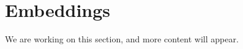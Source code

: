 \section{Embeddings}
\begin{publictodo}We are working on this section, and more content will appear.\end{publictodo}

